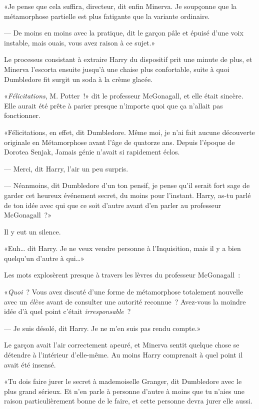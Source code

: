 «Je pense que cela suffira, directeur, dit enfin Minerva. Je soupçonne que la métamorphose partielle est plus fatigante que la variante ordinaire.

--- De moins en moins avec la pratique, dit le garçon pâle et épuisé d'une voix instable, mais ouais, vous avez raison à ce sujet.»

Le processus consistant à extraire Harry du dispositif prit une minute de plus, et Minerva l'escorta ensuite jusqu'à une chaise plus confortable, suite à quoi Dumbledore fit surgit un soda à la crème glacée.

«\emph{Félicitations}, M. Potter~!» dit le professeur McGonagall, et elle était sincère. Elle aurait été prête à parier presque n'importe quoi que ça n'allait pas fonctionner.

«Félicitations, en effet, dit Dumbledore. Même moi, je n'ai fait aucune découverte originale en Métamorphose avant l'âge de quatorze ans. Depuis l'époque de Dorotea Senjak, Jamais génie n'avait si rapidement éclos.

--- Merci, dit Harry, l'air un peu surpris.

--- Néanmoins, dit Dumbledore d'un ton pensif, je pense qu'il serait fort sage de garder cet heureux événement secret, du moins pour l'instant. Harry, as-tu parlé de ton idée avec qui que ce soit d'autre avant d'en parler au professeur McGonagall~?»

Il y eut un silence.

«Euh… dit Harry. Je ne veux vendre personne à l'Inquisition, mais il y a bien quelqu'un d'autre à qui…»

Les mots explosèrent presque à travers les lèvres du professeur McGonagall~:

«\emph{Quoi}~? Vous avez discuté d'une forme de métamorphose totalement nouvelle avec un \emph{élève} avant de consulter une autorité reconnue~? Avez-vous la moindre idée d'à quel point c'était \emph{irresponsable}~?

--- Je suis désolé, dit Harry. Je ne m'en suis pas rendu compte.»

Le garçon avait l'air correctement apeuré, et Minerva sentit quelque chose se détendre à l'intérieur d'elle-même. Au moins Harry comprenait à quel point il avait été insensé.

«Tu dois faire jurer le secret à mademoiselle Granger, dit Dumbledore avec le plus grand sérieux. Et n'en parle à personne d'autre à moins que tu n'aies une raison particulièrement bonne de le faire, et cette personne devra jurer elle aussi.

